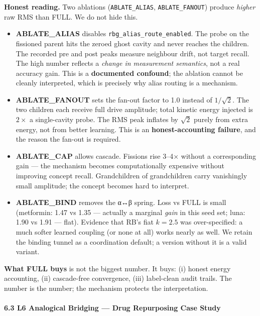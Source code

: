 \documentclass[
  11pt,
  a4paper,
]{article}
\providecommand{\tightlist}{%
  \setlength{\itemsep}{0pt}\setlength{\parskip}{0pt}}
\begin{document}
\textbf{Honest reading.} Two ablations (\texttt{ABLATE\_ALIAS},
\texttt{ABLATE\_FANOUT}) produce \emph{higher} raw RMS than FULL. We do
not hide this.

\begin{itemize}
\tightlist
\item
  \textbf{ABLATE\_ALIAS} disables \texttt{rbg\_alias\_route\_enabled}.
  The probe on the fissioned parent hits the zeroed ghost cavity and
  never reaches the children. The recorded pre and post peaks measure
  neighbour drift, not target recall. The high number reflects a
  \emph{change in measurement semantics}, not a real accuracy gain. This
  is a \textbf{documented confound}; the ablation cannot be cleanly
  interpreted, which is precisely why alias routing is a mechanism.
\item
  \textbf{ABLATE\_FANOUT} sets the fan-out factor to 1.0 instead of
  \(1/\sqrt{2}\). The two children each receive full drive amplitude;
  total kinetic energy injected is \(2\times\) a single-cavity probe.
  The RMS peak inflates by \(\sqrt{2}\) purely from extra energy, not
  from better learning. This is an \textbf{honest-accounting failure},
  and the reason the fan-out is required.
\item
  \textbf{ABLATE\_CAP} allows cascade. Fissions rise 3--4× without a
  corresponding gain --- the mechanism becomes computationally expensive
  without improving concept recall. Grandchildren of grandchildren carry
  vanishingly small amplitude; the concept becomes hard to interpret.
\item
  \textbf{ABLATE\_BIND} removes the α↔β spring. Loss vs FULL is small
  (metformin: 1.47 vs 1.35 --- actually a marginal \emph{gain} in this
  seed set; luna: 1.90 vs 1.91 --- flat). Evidence that RB's fiat
  \(k=2.5\) was over-specified: a much softer learned coupling (or none
  at all) works nearly as well. We retain the binding tunnel as a
  coordination default; a version without it is a valid variant.
\end{itemize}

\textbf{What FULL buys} is not the biggest number. It buys: (i) honest
energy accounting, (ii) cascade-free convergence, (iii) label-clean
audit trails. The number is the number; the mechanism protects the
interpretation.

\paragraph{6.3 L6 Analogical Bridging --- Drug Repurposing Case
Study}\label{l6-analogical-bridging-drug-repurposing-case-study}
\end{document}
